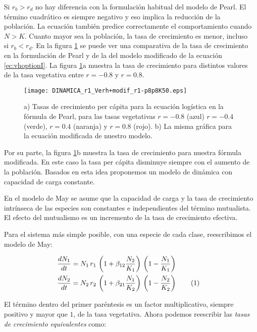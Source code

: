 Si $r_b > r_d$ no hay diferencia con la formulación habitual del modelo de Pearl. El término cuadrático es siempre negativo y eso implica la reducción de la población. La ecuación también predice correctamente el comportamiento cuando $N>K$. Cuanto mayor sea la población, la tasa de crecimiento es menor, incluso si $r_b < r_d$. En la figura \ref{fig:r_equiv_Verh+modif} se puede ver una comparativa de la tasa de crecimiento en la formulación de Pearl y de la del modelo modificado de la ecuación \ref{ec:vhoptionI}. La figura \ref{fig:r_equiv_Verh+modif}a muestra la tasa de crecimiento para distintos valores de la tasa vegetativa entre $r=-0.8$ y $r=0.8$.
 
 
\begin{figure}[ht]
\centering
\texttt{[image: DINAMICA\_r1\_Verh+modif\_r1-p8p8K50.eps]}
\caption{a) Tasas de crecimiento per cápita para la ecuación logística en la fórmula de Pearl, para las tasas vegetativas $r=-0.8$ (azul)
$r=-0.4$ (verde), $r=0.4$ (naranja) y $r=0.8$ (rojo). b) La misma gráfica para la ecuación modificada de nuestro modelo.}
\label{fig:r_equiv_Verh+modif}
\end{figure}

Por su parte, la figura \ref{fig:r_equiv_Verh+modif}b muestra la tasa de crecimiento para nuestra fórmula modificada. En este caso la tasa per cápita disminuye siempre con el aumento de la población. Basados en esta idea proponemos un modelo de dinámica con capacidad de carga constante.

En el modelo de May se asume que la capacidad de carga y la tasa de crecimiento intrínseca de las especies son constantes e independientes del término mutualista. El efecto del mutualismo es un incremento de la tasa de crecimiento efectiva.

Para el sistema más simple posible, con una especie de cada clase, reescribimos el modelo de May:

\begin{align*}
\displaystyle & \frac{dN_1}{dt}= N_1 \, r_1\, \left(1 + \beta_{12}\frac{N_2}{K_1} \right) \, \left(1-\frac{N_1}{K_1}\right) \\
\displaystyle & \frac{dN_2}{dt}=N_2 \, r_2\, \left(1 + \beta_{21}\frac{N_1}{K_2} \right) \, \left(1-\frac{N_2}{K_2}\right)
\stepcounter{equation}\tag{\theequation}
\label{myeq3}
\end{align*}

El término dentro del primer paréntesis es un factor multiplicativo, siempre positivo y mayor que $1$, de la tasa vegetativa.
Ahora podemos reescribir las \textit{tasas de crecimiento equivalentes} como:

